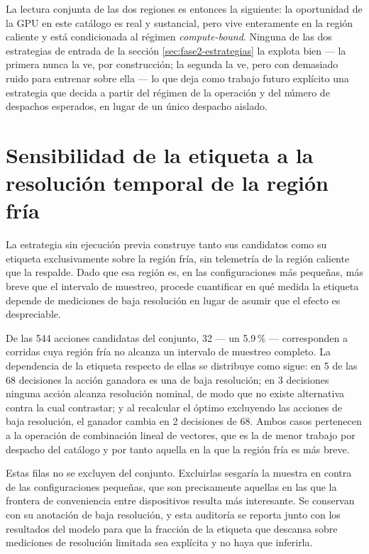 \documentclass[12pt,oneside,spanish]{book}
\begin{document}
La lectura conjunta de las dos regiones es entonces la siguiente: la oportunidad de la GPU en este catálogo es real y sustancial, pero vive enteramente en la región caliente y está condicionada al régimen \textit{compute-bound}. Ninguna de las dos estrategias de entrada de la sección \ref{sec:fase2-estrategias} la explota bien --- la primera nunca la ve, por construcción; la segunda la ve, pero con demasiado ruido para entrenar sobre ella --- lo que deja como trabajo futuro explícito una estrategia que decida a partir del régimen de la operación y del número de despachos esperados, en lugar de un único despacho aislado.

\section{Sensibilidad de la etiqueta a la resolución temporal de la región fría}
\label{sec:resultados-sensibilidad-fria}

La estrategia sin ejecución previa construye tanto sus candidatos como su etiqueta exclusivamente sobre la región fría, sin telemetría de la región caliente que la respalde. Dado que esa región es, en las configuraciones más pequeñas, más breve que el intervalo de muestreo, procede cuantificar en qué medida la etiqueta depende de mediciones de baja resolución en lugar de asumir que el efecto es despreciable.

De las 544 acciones candidatas del conjunto, 32 --- un 5.9\,\% --- corresponden a corridas cuya región fría no alcanza un intervalo de muestreo completo. La dependencia de la etiqueta respecto de ellas se distribuye como sigue: en 5 de las 68 decisiones la acción ganadora es una de baja resolución; en 3 decisiones ninguna acción alcanza resolución nominal, de modo que no existe alternativa contra la cual contrastar; y al recalcular el óptimo excluyendo las acciones de baja resolución, el ganador cambia en 2 decisiones de 68. Ambos casos pertenecen a la operación de combinación lineal de vectores, que es la de menor trabajo por despacho del catálogo y por tanto aquella en la que la región fría es más breve.

Estas filas no se excluyen del conjunto. Excluirlas sesgaría la muestra en contra de las configuraciones pequeñas, que son precisamente aquellas en las que la frontera de conveniencia entre dispositivos resulta más interesante. Se conservan con su anotación de baja resolución, y esta auditoría se reporta junto con los resultados del modelo para que la fracción de la etiqueta que descansa sobre mediciones de resolución limitada sea explícita y no haya que inferirla.
\end{document}

